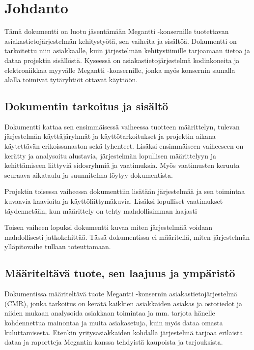\chapter{Johdanto} %
\label{johdanto} %
\thispagestyle{fancy} %


Tämä dokumentti on luotu jäsentämään Megantti -konsernille tuotettavan asiakastietojärjestelmän kehitystyötä, sen vaiheita ja 
sisältöä. Dokumentti on tarkoitettu niin asiakkaalle, kuin järjestelmän kehitystiimille tarjoamaan tietoa ja dataa projektin
sisällöstä. Kyseessä on asiakastietojärjestelmä kodinkoneita ja elektroniikkaa myyvälle Megantti -konsernille, jonka myös 
konsernin samalla alalla toimivat tytäryhtiöt ottavat käyttöön. 

\section{Dokumentin tarkoitus ja sisältö} 

    Dokumentti kattaa sen ensimmäisessä vaiheessa tuotteen määrittelyn, tulevan järjestelmän käyttäjäryhmät ja käyttötarkoitukset
    ja projektin aikana käytettävän erikoissanaston sekä lyhenteet. Lisäksi ensimmäiseen vaiheeseen on kerätty ja analysoitu alustavia,
    järjestelmän lopullisen määrittelyyn ja kehittämiseen liittyviä sidosryhmiä ja vaatimuksia. Myös vaatimusten keruuta seuraava
    aikataulu ja suunnitelma löytyy dokumentista.

    Projektin toisessa vaiheessa dokumenttiin lisätään järjestelmää ja sen toimintaa kuvaavia kaavioita ja käyttöliittymäkuvia. 
    Lisäksi lopulliset vaatimukset täyden\-netään, kun määrittely on tehty mahdollisimman laajasti

    Toisen vaiheen lopuksi dokumentti kuvaa miten järjestelmää voidaan mahdollisesti jatkokehittää.
    Tässä dokumentissa ei määritellä, miten järjestelmän ylläpitovaihe tullaan toteuttamaan.


\section{Määriteltävä tuote, sen laajuus ja ympäristö}

    Dokumentissa määriteltävä tuote Megantti -konsernin asiakastietojärjestelmä (CMR), jonka tarkoitus on kerätä kaikkien asiakkaiden asiakas
    ja ostotiedot ja niiden mukaan analysoida asiakkaan toimintaa ja mm. tarjota hänelle kohdennettua mainontaa ja muita asiakasetuja, 
    kuin myös dataa omasta kuluttamisesta. Etenkin yritysasiakkaiden kohdalla järjestelmä tarjoaa erilaista dataa ja raportteja Megantin 
    kanssa tehdyistä kaupoista ja tarjouksista. 

